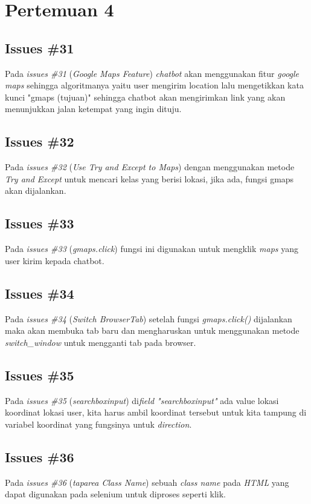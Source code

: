 \chapter{Pertemuan 4}

\section{Issues \#31}
Pada \textit{issues \#31} (\textit{Google Maps Feature}) \textit{chatbot} akan menggunakan fitur \textit{google maps} sehingga algoritmanya yaitu user mengirim location lalu mengetikkan kata kunci "gmaps (tujuan)" sehingga chatbot akan mengirimkan link yang akan menunjukkan jalan ketempat yang ingin dituju.

\section{Issues \#32}
Pada \textit{issues \#32} (\textit{Use Try and Except to Maps}) dengan menggunakan metode \textit{Try and Except} untuk mencari kelas yang berisi lokasi, jika ada, fungsi gmaps akan dijalankan.

\section{Issues \#33}
Pada \textit{issues \#33} (\textit{gmaps.click}) fungsi ini digunakan untuk mengklik \textit{maps} yang user kirim kepada chatbot.

\section{Issues \#34}
Pada \textit{issues \#34} (\textit{Switch BrowserTab}) setelah fungsi \textit{gmaps.click()} dijalankan maka akan membuka tab baru dan mengharuskan untuk menggunakan metode \textit{switch\_window} untuk mengganti tab pada browser.

\section{Issues \#35}
Pada \textit{issues \#35} (\textit{searchboxinput}) di\textit{field "searchboxinput"} ada value lokasi koordinat lokasi user, kita harus ambil koordinat tersebut untuk kita tampung di variabel koordinat yang fungsinya untuk \textit{direction}.

\section{Issues \#36}
Pada \textit{issues \#36} (\textit{taparea Class Name}) sebuah \textit{class name} pada \textit{HTML} yang dapat digunakan pada selenium untuk diproses seperti klik.

